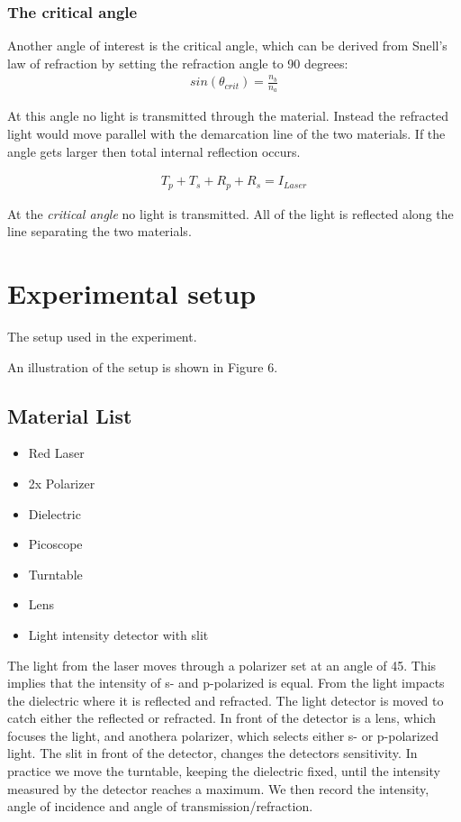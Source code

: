 \documentclass[working]{inputs/tuftebook}
\begin{document}
\subsubsection{The critical angle}
Another angle of interest is the critical angle, which can be derived from Snell's law of refraction by setting the refraction angle to 90 degrees:
\begin{align*}
    sin(\theta_{crit})=\frac{n_b}{n_a}
\end{align*}

At this angle no light is transmitted through the material. Instead the refracted light would move parallel with the demarcation line of the two materials. If the angle gets larger then total internal reflection occurs.

\begin{align*}
    T_p+T_s+R_p+R_s=I_{Laser}
\end{align*}
\begin{marginfigure}
    \caption{At the \textit{critical angle} no light is transmitted. All of the light is reflected along the line separating the two materials. }
    \label{fig:fresnel3}
\end{marginfigure}
\section*{Experimental setup}
\begin{marginfigure}
    \caption{The setup used in the experiment.}
\end{marginfigure}
An illustration of the setup is shown in Figure 6.
\\
\subsection*{Material List}
\begin{itemize}
    \item Red Laser
    \item 2x Polarizer
    \item Dielectric
    \item Picoscope
    \item Turntable 
    \item Lens
    \item Light intensity detector with slit
\end{itemize}
The light from the laser moves through a polarizer set at an angle of 45\textdegree. This implies that the intensity of s- and p-polarized is equal. From the light impacts the dielectric where it is reflected and refracted. The light detector is moved to catch either the reflected or refracted. In front of the detector is a lens, which focuses the light, and anothera polarizer, which selects either s- or p-polarized light. The slit in front of the detector, changes the detectors sensitivity. In practice we move the turntable, keeping the dielectric fixed, until the intensity measured by the detector reaches a maximum. We then record the intensity, angle of incidence and angle of transmission/refraction.
\end{document}
